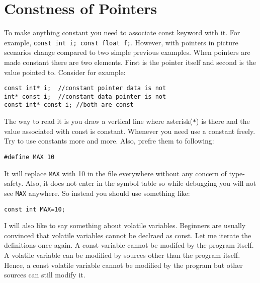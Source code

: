 \section{Constness of Pointers}
To make anything constant you need to associate const keyword with it. For
example, \texttt{const int i; const float f;}. However, with pointers in
picture scenarios change compared to two simple previous examples. When
pointers are made constant there are two elements. First is the pointer itself
and second is the value pointed to. Consider for example:

\begin{verbatim}
const int* i;  //constant pointer data is not
int* const i;  //constant data pointer is not
const int* const i; //both are const
\end{verbatim}
The way to read it is you draw a vertical line where asterisk(\texttt{*}) is
there and the value associated with const is constant. Whenever you need use a
constant freely. Try to use constants more and more. Also, prefre them to
following:

\begin{verbatim}
#define MAX 10
\end{verbatim}

It will replace \texttt{MAX} with 10 in the file everywhere without any concern
of type-safety. Also, it does not enter in the symbol table so while debugging
you will not see \texttt{MAX} anywhere. So instead you should use something
like:

\begin{verbatim}
const int MAX=10;
\end{verbatim}

I will also like to say something about volatile variables. Beginners are
usually convinced that volatile variables cannot be declraed as const. Let me
iterate the definitions once again. A const variable cannot be modifed by the
program itself. A volatile variable can be modified by sources other than the
program itself. Hence, a const volatile variable cannot be modified by the
program but other sources can still modify it.
